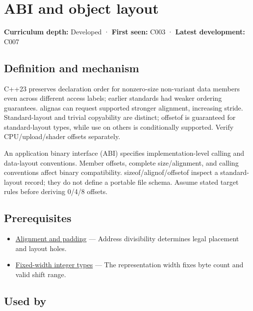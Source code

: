 \hypertarget{appendix-c4ac6bb0fff8}{}
\section{ABI and object layout}\label{appendix-c4ac6bb0fff8-abi-and-object-layout}

\textbf{Curriculum depth:} Developed · \textbf{First seen:} C003 · \textbf{Latest development:} C007

\subsection{Definition and mechanism}\label{appendix-c4ac6bb0fff8-definition-and-mechanism}

C++23 preserves declaration order for nonzero-size non-variant data members even across different access labels; earlier standards had weaker ordering guarantees. alignas can request supported stronger alignment, increasing stride. Standard-layout and trivial copyability are distinct; offsetof is guaranteed for standard-layout types, while use on others is conditionally supported. Verify CPU/upload/shader offsets separately.

An application binary interface (ABI) specifies implementation-level calling and data-layout conventions. Member offsets, complete size/alignment, and calling conventions affect binary compatibility. sizeof/alignof/offsetof inspect a standard-layout record; they do not define a portable file schema. Assume stated target rules before deriving 0/4/8 offsets.

\subsection{Prerequisites}\label{appendix-c4ac6bb0fff8-prerequisites}

\begin{itemize}
\tightlist
\item
  \hyperref[appendix-a1f7c53b4742]{Alignment and padding} --- Address divisibility determines legal placement and layout holes.
\item
  \hyperref[appendix-cc04044b5782]{Fixed-width integer types} --- The representation width fixes byte count and valid shift range.
\end{itemize}

\subsection{Used by}\label{appendix-c4ac6bb0fff8-used-by}


